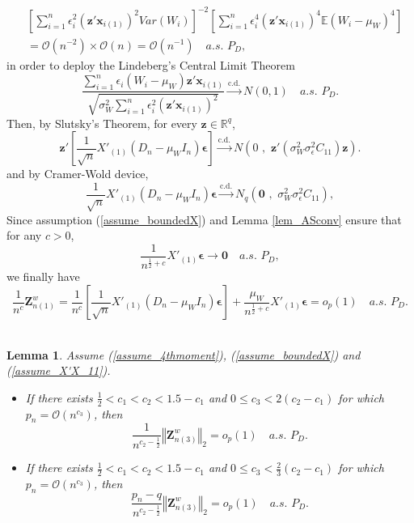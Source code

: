 \documentclass[ejs,authoryear,linksfromyear]{imsart}
\newcommand{\sumin}{\sum_{i=1}^n} %
\newcommand{\CONV}[1]{\stackrel{\text{#1}}{\longrightarrow}} %
\newcommand{\znwa}{\bm{Z}_{n(1)}^w}
\newcommand{\znwc}{\bm{Z}_{n(3)}^w}
\numberwithin{equation}{section}
\theoremstyle{plain}
\newtheorem{lem}{Lemma}[section]
\begin{document}
\begin{align*}
&\left[ 
	\sumin \epsilon_i^2 \left( \bm{z}'\bm{x}_{i(1)} \right)^2 Var(W_i) 
\right]^{-2}
\left[
	\sumin \epsilon_i^4 
	\left( \bm{z}'\bm{x}_{i(1)} \right)^4
\mathbb{E} (W_i - \mu_W)^4
\right] \\
&= \mathcal{O} \left( n^{-2} \right) 
\times
\mathcal{O} \left( n \right) 
= \mathcal{O} \left( n^{-1} \right)
\quad a.s. \,\, P_D, 
\end{align*}
in order to deploy the Lindeberg's Central Limit Theorem
$$
\dfrac{ \sumin \epsilon_i (W_i - \mu_W) \bm{z}' \bm{x}_{i(1)} }
{ \sqrt{ \sigma_W^2 \sumin \epsilon_i^2 \left( \bm{z}' \bm{x}_{i(1)} \right)^2 } }
\CONV{c.d.} N(0,1) \quad a.s. \,\, P_D. 
$$
Then, by Slutsky's Theorem, for every $\bm{z} \in \mathbb{R}^q$, 
$$
\bm{z}' \left[ \dfrac{1}{\sqrt{n}} X'_{(1)} (D_n - \mu_W I_n) \bm{\epsilon} \right] 
\CONV{c.d.} N 
\left(
	0 \,\, , \,\,
	\bm{z}' \left( \sigma^2_W \sigma^2_\epsilon C_{11} \right) \bm{z} 
\right).
$$
and by Cramer-Wold device,
$$
\dfrac{1}{\sqrt{n}} X'_{(1)} (D_n - \mu_W I_n) \bm{\epsilon} 
\CONV{c.d.} N_q 
\left(
\bm{0} \,\, , \,\,
\sigma^2_W \sigma^2_\epsilon C_{11} 
\right),
$$
Since assumption (\ref{assume_boundedX}) and Lemma \ref{lem_ASconv} ensure that for any $c >0$,
	$$
	\dfrac{1}{n^{\frac{1}{2}+c}} X'_{(1)} \bm{\epsilon}
	\to \bm{0} \quad a.s. \,\, P_D, 
	$$
we finally have
	$$
	\dfrac{1}{n^c} \znwa
	= \dfrac{1}{n^c} \left[ \dfrac{1}{\sqrt{n}} X'_{(1)} (D_n - \mu_W I_n) \bm{\epsilon} \right]
	+ \dfrac{\mu_W}{n^{\frac{1}{2}+c}} X'_{(1)} \bm{\epsilon}
	= o_p(1) \quad a.s. \,\, P_D.
	$$
\\

\begin{lem} \label{lem_Znw3}
	Assume (\ref{assume_4thmoment}), (\ref{assume_boundedX}) and (\ref{assume_X'X_11}).
	\begin{itemize}
		\item [ (a) ] If there exists $\frac{1}{2} < c_1 < c_2 < 1.5 - c_1$ and $0 \leq c_3 < 2(c_2 - c_1)$ for which $p_n = \mathcal{O}(n^{c_3})$, then
		$$
		\dfrac{1}{n^{c_2 - \frac{1}{2}}}
		\left\Vert \znwc \right\Vert_2
		= o_p(1) \quad a.s. \,\, P_D.
		$$
		\item [ (b) ] If there exists $\frac{1}{2} < c_1 < c_2 < 1.5 - c_1$ and $0 \leq c_3 < \frac{2}{3}(c_2 - c_1)$ for which $p_n = \mathcal{O}(n^{c_3})$, then
		$$
		\dfrac{p_n-q}{n^{c_2 - \frac{1}{2}}}
		\left\Vert \znwc \right\Vert_2
		= o_p(1) \quad a.s. \,\, P_D.
		$$
	\end{itemize} 
\end{lem}
\end{document}
